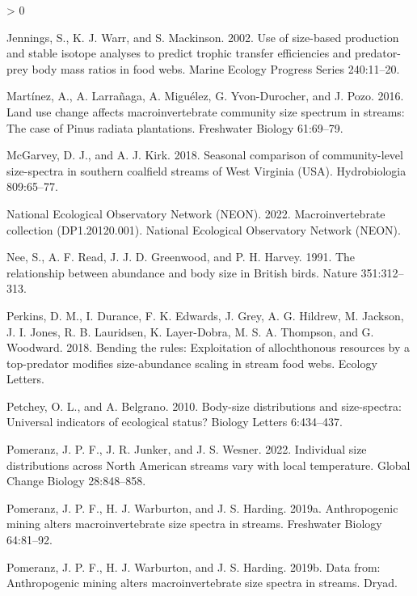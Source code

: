 \documentclass[
]{article}
\newlength{\cslhangindent}
\newenvironment{CSLReferences}[2] %
 {%
  \setlength{\parindent}{0pt}
  \ifodd #1 \everypar{\setlength{\hangindent}{\cslhangindent}}\ignorespaces\fi
  \ifnum #2 > 0
  \setlength{\parskip}{#2\baselineskip}
  \fi
 }%
 {}
\begin{document}
\begin{CSLReferences}{1}{0}
\leavevmode\hypertarget{ref-Jennings2002}{}%
Jennings, S., K. J. Warr, and S. Mackinson. 2002. Use of size-based
production and stable isotope analyses to predict trophic transfer
efficiencies and predator-prey body mass ratios in food webs. Marine
Ecology Progress Series 240:11--20.

\leavevmode\hypertarget{ref-martinez2016}{}%
Martínez, A., A. Larrañaga, A. Miguélez, G. Yvon-Durocher, and J. Pozo.
2016. Land use change affects macroinvertebrate community size spectrum
in streams: The case of {Pinus} radiata plantations. Freshwater Biology
61:69--79.

\leavevmode\hypertarget{ref-mcgarvey2018}{}%
McGarvey, D. J., and A. J. Kirk. 2018. Seasonal comparison of
community-level size-spectra in southern coalfield streams of {West
Virginia} ({USA}). Hydrobiologia 809:65--77.

\leavevmode\hypertarget{ref-NEON_Inverts2022}{}%
National Ecological Observatory Network (NEON). 2022. Macroinvertebrate
collection ({DP1}.20120.001). {National Ecological Observatory Network
(NEON)}.

\leavevmode\hypertarget{ref-Nee1991}{}%
Nee, S., A. F. Read, J. J. D. Greenwood, and P. H. Harvey. 1991. The
relationship between abundance and body size in {British} birds. Nature
351:312--313.

\leavevmode\hypertarget{ref-perkins2018}{}%
Perkins, D. M., I. Durance, F. K. Edwards, J. Grey, A. G. Hildrew, M.
Jackson, J. I. Jones, R. B. Lauridsen, K. Layer-Dobra, M. S. A.
Thompson, and G. Woodward. 2018. Bending the rules: Exploitation of
allochthonous resources by a top-predator modifies size-abundance
scaling in stream food webs. Ecology Letters.

\leavevmode\hypertarget{ref-Petchey2010}{}%
Petchey, O. L., and A. Belgrano. 2010. Body-size distributions and
size-spectra: Universal indicators of ecological status? Biology Letters
6:434--437.

\leavevmode\hypertarget{ref-pomeranz2022}{}%
Pomeranz, J. P. F., J. R. Junker, and J. S. Wesner. 2022. Individual
size distributions across {North American} streams vary with local
temperature. Global Change Biology 28:848--858.

\leavevmode\hypertarget{ref-pomeranz2019}{}%
Pomeranz, J. P. F., H. J. Warburton, and J. S. Harding. 2019a.
Anthropogenic mining alters macroinvertebrate size spectra in streams.
Freshwater Biology 64:81--92.

\leavevmode\hypertarget{ref-Pomeranz2019}{}%
Pomeranz, J. P. F., H. J. Warburton, and J. S. Harding. 2019b. Data
from: {Anthropogenic} mining alters macroinvertebrate size spectra in
streams. {Dryad}.


\end{CSLReferences}
\end{document}
